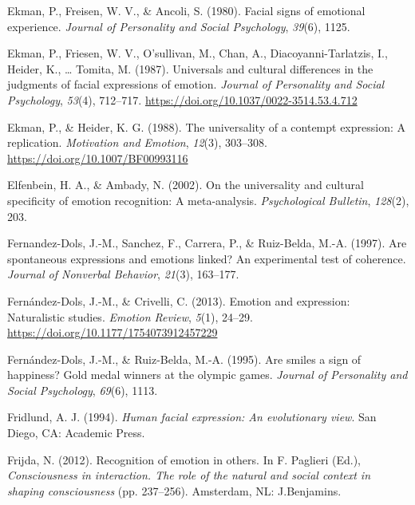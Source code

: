 \documentclass[man]{apa6}
\begin{document}
\leavevmode\hypertarget{ref-ekman1980facial}{}%
Ekman, P., Freisen, W. V., \& Ancoli, S. (1980). Facial signs of emotional experience. \emph{Journal of Personality and Social Psychology}, \emph{39}(6), 1125.

\leavevmode\hypertarget{ref-ekman1987universals}{}%
Ekman, P., Friesen, W. V., O'sullivan, M., Chan, A., Diacoyanni-Tarlatzis, I., Heider, K., \ldots{} Tomita, M. (1987). Universals and cultural differences in the judgments of facial expressions of emotion. \emph{Journal of Personality and Social Psychology}, \emph{53}(4), 712--717. \url{https://doi.org/10.1037/0022-3514.53.4.712}

\leavevmode\hypertarget{ref-ekman1988universality}{}%
Ekman, P., \& Heider, K. G. (1988). The universality of a contempt expression: A replication. \emph{Motivation and Emotion}, \emph{12}(3), 303--308. \url{https://doi.org/10.1007/BF00993116}

\leavevmode\hypertarget{ref-elfenbein2002universality}{}%
Elfenbein, H. A., \& Ambady, N. (2002). On the universality and cultural specificity of emotion recognition: A meta-analysis. \emph{Psychological Bulletin}, \emph{128}(2), 203.

\leavevmode\hypertarget{ref-fernandez1997spontaneous}{}%
Fernandez-Dols, J.-M., Sanchez, F., Carrera, P., \& Ruiz-Belda, M.-A. (1997). Are spontaneous expressions and emotions linked? An experimental test of coherence. \emph{Journal of Nonverbal Behavior}, \emph{21}(3), 163--177.

\leavevmode\hypertarget{ref-fernandez2013emotion}{}%
Fernández-Dols, J.-M., \& Crivelli, C. (2013). Emotion and expression: Naturalistic studies. \emph{Emotion Review}, \emph{5}(1), 24--29. \url{https://doi.org/10.1177/1754073912457229}

\leavevmode\hypertarget{ref-fernandez1995smiles}{}%
Fernández-Dols, J.-M., \& Ruiz-Belda, M.-A. (1995). Are smiles a sign of happiness? Gold medal winners at the olympic games. \emph{Journal of Personality and Social Psychology}, \emph{69}(6), 1113.

\leavevmode\hypertarget{ref-fridlund1994human}{}%
Fridlund, A. J. (1994). \emph{Human facial expression: An evolutionary view}. San Diego, CA: Academic Press.

\leavevmode\hypertarget{ref-frijda2012recognition}{}%
Frijda, N. (2012). Recognition of emotion in others. In F. Paglieri (Ed.), \emph{Consciousness in interaction. The role of the natural and social context in shaping consciousness} (pp. 237--256). Amsterdam, NL: J.Benjamins.
\end{document}

